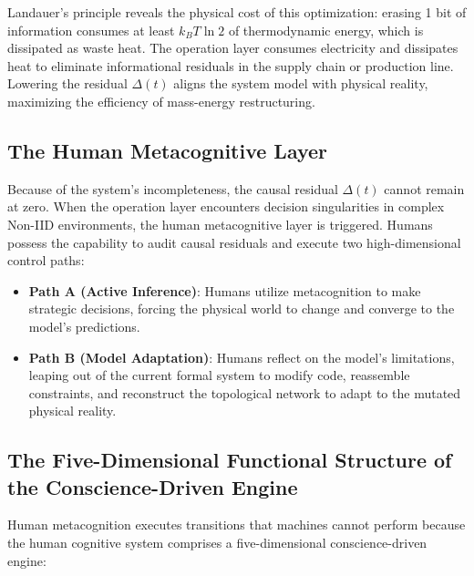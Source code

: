 \documentclass{article}
\begin{document}
Landauer's principle reveals the physical cost of this optimization: erasing 1 bit of information consumes at least $k_B T \ln 2$ of thermodynamic energy, which is dissipated as waste heat. The operation layer consumes electricity and dissipates heat to eliminate informational residuals in the supply chain or production line. Lowering the residual $\Delta(t)$ aligns the system model with physical reality, maximizing the efficiency of mass-energy restructuring.

\subsection{The Human Metacognitive Layer}
Because of the system's incompleteness, the causal residual $\Delta(t)$ cannot remain at zero. When the operation layer encounters decision singularities in complex Non-IID environments, the human metacognitive layer is triggered. Humans possess the capability to audit causal residuals and execute two high-dimensional control paths:
\begin{itemize}
    \item \textbf{Path A (Active Inference)}: Humans utilize metacognition to make strategic decisions, forcing the physical world to change and converge to the model's predictions.
    \item \textbf{Path B (Model Adaptation)}: Humans reflect on the model's limitations, leaping out of the current formal system to modify code, reassemble constraints, and reconstruct the topological network to adapt to the mutated physical reality.
\end{itemize}

\subsection{The Five-Dimensional Functional Structure of the Conscience-Driven Engine}
Human metacognition executes transitions that machines cannot perform because the human cognitive system comprises a five-dimensional conscience-driven engine:
\end{document}
